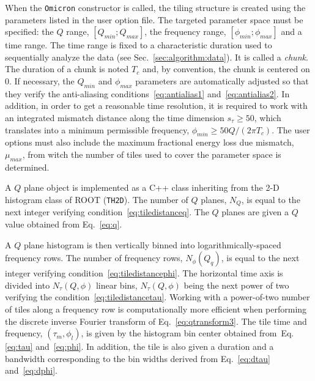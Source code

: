 When the \texttt{Omicron} constructor is called, the tiling structure is created using the parameters listed in the user option file. The targeted parameter space must be specified: the $Q$ range, $[Q_{min}; Q_{max}]$, the frequency range, $[\phi_{min}; \phi_{max}]$ and a time range. The time range is fixed to a characteristic duration used to sequentially analyze the data (see Sec.~\ref{sec:algorithm:data}). It is called a \textit{chunk}. The duration of a chunk is noted $T_c$ and, by convention, the chunk is centered on 0. If necessary, the $Q_{min}$ and $\phi_{max}$ parameters are automatically adjusted so that they verify the anti-aliasing conditions~\ref{eq:antialias1} and~\ref{eq:antialias2}. In addition, in order to get a reasonable time resolution, it is required to work with an integrated mismatch distance along the time dimension $s_\tau\ge50$, which translates into a minimum permissible frequency, $\phi_{min} \ge 50Q/(2\pi T_c)$.
The user options must also include the maximum fractional energy loss due mismatch, $\mu_{max}$, from witch the number of tiles used to cover the parameter space is determined.

A $Q$ plane object is implemented as a C++ class inheriting from the 2-D histogram class of ROOT (\texttt{TH2D}). The number of $Q$ planes, $N_Q$, is equal to the next integer verifying condition~\ref{eq:tiledistanceq}. The $Q$ planes are given a $Q$ value obtained from Eq.~\ref{eq:q}.

A $Q$ plane histogram is then vertically binned into logarithmically-spaced frequency rows. The number of frequency rows, $N_\phi(Q_q)$, is equal to the next integer verifying condition~\ref{eq:tiledistancephi}. The horizontal time axis is divided into $N_\tau(Q,\phi)$ linear bins, $N_\tau(Q,\phi)$ being the next power of two verifying the condition~\ref{eq:tiledistancetau}. Working with a power-of-two number of tiles along a frequency row is computationally more efficient when performing the discrete inverse Fourier transform of Eq.~\ref{eq:qtransform3}. The tile time and frequency, $(\tau_m, \phi_l)$, is given by the histogram bin center obtained from~Eq.\ref{eq:tau} and~\ref{eq:phi}. In addition, the tile is also given a duration and a bandwidth corresponding to the bin widths derived from Eq.~\ref{eq:dtau} and~\ref{eq:dphi}. 


